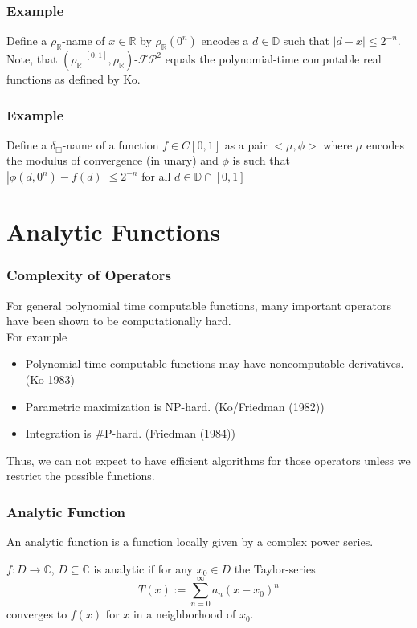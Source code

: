 \documentclass[xcolor=pdftex,dvipsnames,table,handout]{beamer}
\newcommand{\R}{\ensuremath{\mathbb{R}}}
\newcommand{\RR}{\ensuremath{\mathbb{R}}}
\newcommand{\C}{\ensuremath{\mathbb{C}}}
\newcommand{\D}{\ensuremath{\mathbb{D}}}
\newcommand{\abs}[1]{\left|#1\right|}
\newcommand{\fpt}{\ensuremath{\mathcal{FP}^2}\xspace}
\begin{document}
\begin{frame}
  \frametitle{Example}
  Define a $\rho_\R$-name of $x \in \RR$ by
  $\rho_\R(0^n)$ encodes a $d \in \D$ such that $\abs{d-x} \leq 2^{-n} $. 
  Note, that $(\rho_\R|^{[0,1]}, \rho_\R)$-\fpt equals the polynomial-time computable real functions as defined by Ko.
\end{frame}
\begin{frame}
  \frametitle{Example}
  Define a $\delta_\Box$-name of a function $f \in C[0,1]$ as a pair $<\mu, \phi>$ where $\mu$ encodes the modulus of convergence (in unary) and $\phi$ is such that $\abs{\phi(d, 0^n)-f(d)} \leq 2^{-n}$ for all $d \in \D \cap [0,1]$
  \end{frame}
\section{Analytic Functions}
\begin{frame}
\frametitle{Complexity of Operators}
\begin{fact}
For general polynomial time computable functions, many important operators have been shown to be computationally hard.\\
For example
\pause
\begin{itemize}[<+->]
\item Polynomial time computable functions may have noncomputable derivatives. (Ko 1983)
\item Parametric maximization is NP-hard. (Ko/Friedman (1982))
\item Integration is \#P-hard. (Friedman (1984))
\end{itemize}
\end{fact}
\pause
Thus, we can not expect to have efficient algorithms for those operators unless we restrict the possible functions.
\end{frame}
\begin{frame}
\frametitle{Analytic Function}
An analytic function is a function locally given by a complex power series.\\
\begin{definition}
$f : D \to \C $, $D \subseteq \C$ is analytic if for any $x_0 \in D$ the Taylor-series
$$ T(x) := \sum^\infty_{n=0} a_n(x-x_0)^n$$
converges to $f(x)$ for $x$ in a neighborhood of $x_0$.  
\end{definition}
\end{frame}
\end{document}
